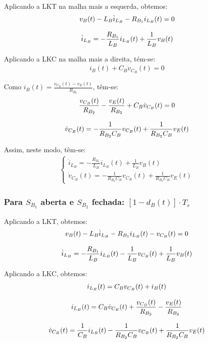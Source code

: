 \documentclass{article}
\newcommand{\nle}{%
  \notag \\[8pt]
}
\begin{document}
Aplicando a LKT na malha mais a esquerda, obtemos:
\begin{gather}
  v_B(t) - L_B \dot{i}_{L_B} - R_{B_1} i_{L_B} (t) = 0 \nle
  \dot{i}_{L_B} = - \frac{R_{B_1}}{L_B} i_{L_B}(t) + \frac{1}{L_B} v_B(t)
\end{gather}

Aplicando a LKC na malha mais a direita, tém-se:
\begin{gather}
  i_B(t) + C_B \dot{v}_{C_B}(t) = 0
\end{gather}

Como $i_B(t) = \frac{v_{C_B}(t) - v_E(t)}{R_{B_2}}$, têm-se:
\begin{gather}
  \frac{v_{C_B}(t)}{R_{B_2}} - \frac{v_E(t)}{R_{B_2}} + C_B \dot{v}_{C_B}(t) = 0 \nle
  \dot{v}_{C_B}(t) = - \frac{1}{R_{B_2} C_B} v_{C_B}(t) + \frac{1}{R_{B_2} C_B} v_{E}(t)
\end{gather}

Assim, neste modo, têm-se:
\begin{gather}
  \begin{cases}
    \dot{i}_{L_B} = \displaystyle - \frac{R_{B_1}}{L_B} i_{L_B}(t) + \frac{1}{L_B} v_B(t) \\[8pt]
    \dot{v}_{C_B}(t) = \displaystyle - \frac{1}{R_{B_2} C_B} v_{C_B}(t) + \frac{1}{R_{B_2} C_B} v_{E}(t)
  \end{cases}
\end{gather}

\vspace*{8pt}
\subsubsection*{Para $S_{B_1}$ aberta e $S_{B_2}$ fechada: $\left[1 - d_B(t)\right] \cdot T_s$}

Aplicando a LKT, obtemos:
\begin{gather}
  v_B(t) - L_B \dot{i}_{L_B} - R_{B_1} i_{L_B} (t) - v_{C_B} (t)= 0 \nle
  \dot{i}_{L_B} = - \frac{R_{B_1}}{L_B} i_{L_B}(t) - \frac{1}{L_B} v_{C_B} (t) + \frac{1}{L_B} v_B(t)
\end{gather}

Aplicando a LKC, obtemos:
\begin{gather}
  i_{L_B}(t) = C_B v_{C_B}(t) + i_B(t) \nle
  i_{L_B}(t) = C_B \dot{v}_{C_B}(t) +  \frac{v_{C_B}(t)}{R_{B_2}} - \frac{v_E(t)}{R_{B_2}} \nle
  \dot{v}_{C_B}(t) =  \frac{1}{C_B} i_{L_B}(t) - \frac{1}{R_{B_2}C_B} v_{C_B}(t) + \frac{1}{R_{B_2} C_B} v_E(t)
\end{gather}
\end{document}
